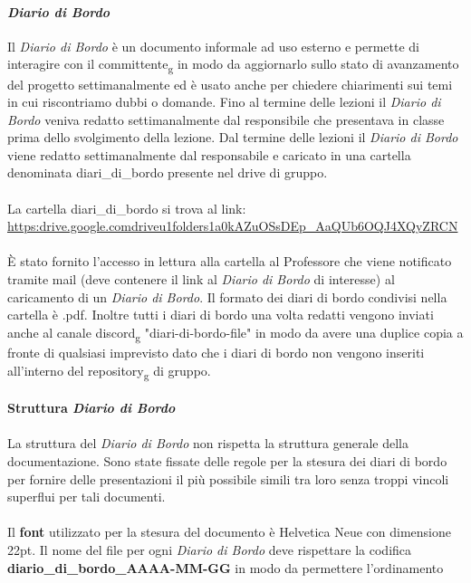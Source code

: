 \paragraph{\textit{Diario di Bordo}}
Il \textit{Diario di Bordo} è un documento informale ad uso esterno e permette di interagire con il committente\textsubscript{g} in modo da aggiornarlo sullo stato di avanzamento del progetto settimanalmente ed è usato 
anche per chiedere chiarimenti sui temi in cui riscontriamo dubbi o domande.
Fino al termine delle lezioni il \textit{Diario di Bordo} veniva redatto settimanalmente dal responsibile che presentava in classe prima dello svolgimento 
della lezione.
Dal termine delle lezioni il \textit{Diario di Bordo} viene redatto settimanalmente dal responsabile e caricato in una cartella denominata diari\_di\_bordo presente nel drive di gruppo.
\\\\
La cartella diari\_di\_bordo si trova al link: \href{https://drive.google.com/drive/u/1/folders/1a0kAZuOSsDEp_AaQUb6OQJ4XQyZ--RCN}{\\https:\/\/drive.google.com\/drive\/u\/1\/folders\/1a0kAZuOSsDEp\_AaQUb6OQJ4XQyZ\-\-RCN}
\\\\
È stato fornito l'accesso in lettura alla cartella al Professore che viene notificato tramite mail (deve contenere il link al \textit{Diario di Bordo} di interesse) al caricamento di un \textit{Diario di Bordo}.
Il formato dei diari di bordo condivisi nella cartella è .pdf.
Inoltre tutti i diari di bordo una volta redatti vengono inviati anche al canale discord\textsubscript{g} "diari-di-bordo-file" in modo da avere una duplice copia a fronte di 
qualsiasi imprevisto dato che i diari di bordo non vengono inseriti all'interno del repository\textsubscript{g} di gruppo.
\\\\
\textbf{Struttura \textit{Diario di Bordo}} 
\\\\
La struttura del \textit{Diario di Bordo} non rispetta la struttura generale della documentazione.
Sono state fissate delle regole per la stesura dei diari di bordo per fornire delle presentazioni il più possibile simili tra loro 
senza troppi vincoli superflui per tali documenti.
\\\\
Il \textbf{font} utilizzato per la stesura del documento è Helvetica Neue con dimensione 22pt.
Il nome del file per ogni \textit{Diario di Bordo} deve rispettare la codifica \textbf{diario\_di\_bordo\_AAAA-MM-GG} in modo da permettere l'ordinamento
